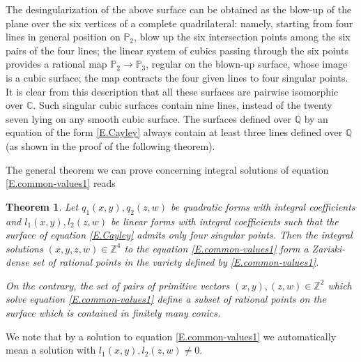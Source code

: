 \documentclass[leqno,12pt]{article} %
\def\Z{{{\mathbb Z}}}
\def\Q{{{\mathbb Q}}}
\def\C{{{\mathbb C}}}
\def\P{{{\mathbb P}}}
\theoremstyle{plain} %
\newtheorem{theorem}{\indent\sc Theorem}[section]
\theoremstyle{definition} %
\begin{document}
The desingularization of the above surface can be obtained as the blow-up of the plane over the six vertices of a complete quadrilateral: namely, starting from four lines in general position on $\P_2$, blow up the six intersection points among the six pairs of the four lines; the linear system of cubics passing through the six points provides a rational map $\P_2\to\P_3$, regular on the blown-up surface,  whose image is a cubic surface; the map  contracts the four given lines to four singular points. It is clear from this description that all these surfaces are pairwise isomorphic over $\C$. Such singular cubic surfaces contain nine lines, instead of the twenty seven lying on any smooth cubic surface. The surfaces defined over $\Q$ by an equation of the form \eqref{E.Cayley} always contain at least three lines defined over $\Q$ (as shown in the proof of the following theorem).

\smallskip

The general theorem we can prove concerning integral solutions of equation \eqref{E.common-values1}  reads

\begin{theorem}\label{T.Cayley}
Let $q_1(x,y),q_2(z,w)$ be quadratic forms with integral coefficients and $l_1(x,y),l_2(z,w)$ be linear forms with integral coefficients such that the surface of equation \eqref{E.Cayley} admits only four singular points. Then   the integral solutions $(x,y,z,w)\in\Z^4$ to the equation \eqref{E.common-values1}   form a  Zariski-dense set of rational points in the variety defined by \eqref{E.common-values1}.

On the contrary, the set of pairs of primitive vectors $(x,y), (z,w)\in\Z^2$ which solve equation \eqref{E.common-values1} define a subset of rational points on the surface which is contained in finitely many conics.
\end{theorem}

We note that by a solution to equation \eqref{E.common-values1} we automatically mean a solution with $l_1(x,y), l_2(z,w)\neq 0 $. 

\smallskip
\end{document}
